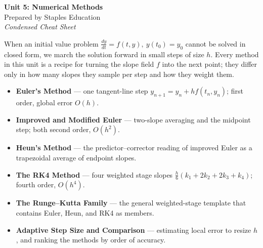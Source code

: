 




\begin{center}
    {\LARGE \bfseries Unit 5: Numerical Methods}\\[6pt]
    {\large Prepared by Staples Education}\\[4pt]
    {\itshape Condensed Cheat Sheet}
\end{center}

\vspace{0.4em}

\begin{topicsbox}
When an initial value problem $\frac{dy}{dt}=f(t,y),\ y(t_0)=y_0$ cannot be
solved in closed form, we march the solution forward in small steps of size $h$.
Every method in this unit is a recipe for turning the slope field $f$ into the
next point; they differ only in how many slopes they sample per step and how they
weight them.
\begin{itemize}[leftmargin=1.4em, itemsep=3pt]
    \item \textbf{Euler's Method} --- one tangent-line step
          $y_{n+1}=y_n+hf(t_n,y_n)$; first order, global error $O(h)$.
    \item \textbf{Improved and Modified Euler} --- two-slope averaging and the
          midpoint step; both second order, $O(h^{2})$.
    \item \textbf{Heun's Method} --- the predictor--corrector reading of improved
          Euler as a trapezoidal average of endpoint slopes.
    \item \textbf{The RK4 Method} --- four weighted stage slopes
          $\tfrac{h}{6}(k_1+2k_2+2k_3+k_4)$; fourth order, $O(h^{4})$.
    \item \textbf{The Runge--Kutta Family} --- the general weighted-stage template
          that contains Euler, Heun, and RK4 as members.
    \item \textbf{Adaptive Step Size and Comparison} --- estimating local error to
          resize $h$, and ranking the methods by order of accuracy.
\end{itemize}
\end{topicsbox}

